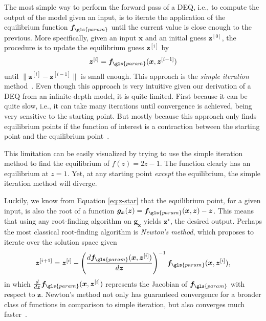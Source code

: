 The most simple way to perform the forward pass of a \gls{DEQ}, i.e., to compute the output of the model given an input, is to iterate the application of the equilibrium function $\bm{f}_{\gls{param}}$ until the current value is close enough to the previous.
More specifically, given an input $\bm{x}$ and an initial guess $\bm{z}^{[0]}$, the procedure is to update the equilibrium guess $\bm{z}^{[i]}$ by \[
    \bm{z}^{[i]} = \bm{f}_{\gls{param}}(\bm{x}, \bm{z}^{[i-1]})
\] until $\|\bm{z}^{[i]}-\bm{z}^{[i-1]}\|$ is small enough.
This approach is the \emph{simple iteration} method~\cite{suli_introduction_2003}.
Even though this approach is very intuitive given our derivation of a \gls{DEQ} from an infinite-depth model, it is quite limited.
First because it can be quite slow, i.e., it can take many iterations until convergence is achieved, being very sensitive to the starting point.
But mostly because this approach only finds equilibrium points if the function of interest is a contraction between the starting point and the equilibrium point~\cite{suli_introduction_2003}.

This limitation can be easily visualized by trying to use the simple iteration method to find the equilibrium of $f(z) = 2z-1$.
The function clearly has an equilibrium at $z=1$.
Yet, at any starting point \emph{except} the equilibrium, the simple iteration method will diverge.

Luckily, we know from Equation \eqref{eq:z-star} that the equilibrium point, for a given input, is also the root of a function $\bm{g}_{\bm{x}}(\bm{z}) = \bm{f}_{\gls{param}}(\bm{x},\bm{z}) - \bm{z}$.
This means that using any root-finding algorithm on $\bm{g}_{\bm{x}}$ yields $\bm{z}^{\star}$, the desired output.
Perhaps the most classical root-finding algorithm is \emph{Newton's method}, which proposes to iterate over the solution space given \[
    \bm{z}^{[i+1]} = \bm{z}^{[i]} - \left( \frac{d \bm{f}_{\gls{param}}(\bm{x},\bm{z}^{[i]})}{d\bm{z}}  \right)^{-1} \bm{f}_{\gls{param}}(\bm{x},\bm{z}^{[i]})
,\] 
in which $\frac{d} {d\bm{z}} \bm{f}_{\gls{param}}(\bm{x},\bm{z}^{[i]})$ represents the Jacobian of  $\bm{f}_{\gls{param}}$ with respect to $\bm{z}$\footnotemark.
Newton's method not only has guaranteed convergence for a broader class of functions in comparison to simple iteration, but also converges much faster~\cite{suli_introduction_2003}.

